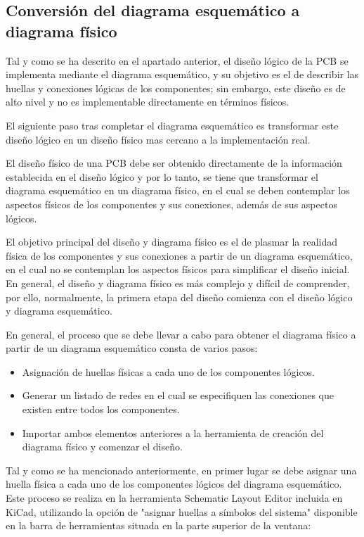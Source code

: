 \subsection{Conversión del diagrama esquemático a diagrama físico}

Tal y como se ha descrito en el apartado anterior, el diseño lógico de la PCB se implementa mediante el diagrama esquemático, y su objetivo es el de describir las huellas y conexiones lógicas de los componentes; sin embargo, este diseño es de alto nivel y no es implementable directamente en términos físicos. 

El siguiente paso tras completar el diagrama esquemático es transformar este diseño lógico en un diseño físico mas cercano a la implementación real. 

El diseño físico de una PCB debe ser obtenido directamente de la información establecida en el diseño lógico y por lo tanto, se tiene que transformar el diagrama esquemático en un diagrama físico, en el cual se deben contemplar los aspectos físicos de los componentes y sus conexiones, además de sus aspectos lógicos.

El objetivo principal del diseño y diagrama físico es el de plasmar la realidad física de los componentes y sus conexiones a partir de un diagrama esquemático, en el cual no se contemplan los aspectos físicos para simplificar el diseño inicial. En general, el diseño y diagrama físico es más complejo y difícil de comprender, por ello, normalmente, la primera etapa del diseño comienza con el diseño lógico y diagrama esquemático.

En general, el proceso que se debe llevar a cabo para obtener el diagrama físico a partir de un diagrama esquemático consta de varios pasos:
\begin{itemize}
    \item Asignación de huellas físicas a cada uno de los componentes lógicos.
    \item Generar un listado de redes en el cual se especifiquen las conexiones que existen entre todos los componentes.
    \item Importar ambos elementos anteriores a la herramienta de creación del diagrama físico y comenzar el diseño.
\end{itemize}

Tal y como se ha mencionado anteriormente, en primer lugar se debe asignar una huella física a cada uno de los componentes lógicos del diagrama esquemático. Este proceso se realiza en la herramienta Schematic Layout Editor incluida en KiCad, utilizando la opción de "asignar huellas a símbolos del sistema" disponible en la barra de herramientas situada en la parte superior de la ventana:

